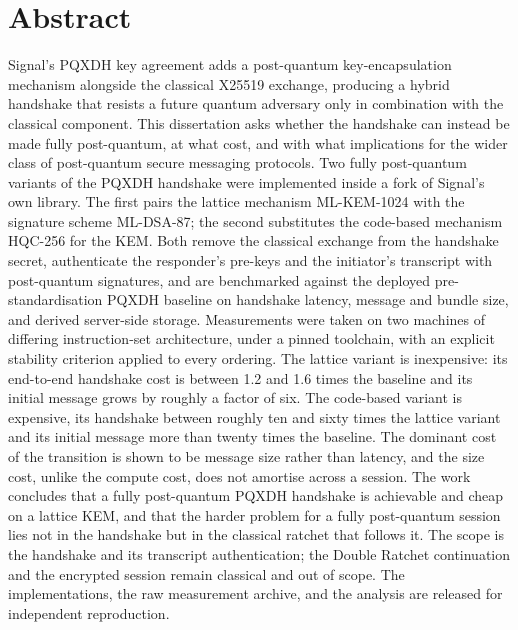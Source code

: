 \section*{Abstract}

Signal's PQXDH key agreement adds a post-quantum key-encapsulation mechanism alongside the classical X25519 exchange, producing a hybrid handshake that resists a future quantum adversary only in combination with the classical component. This dissertation asks whether the handshake can instead be made fully post-quantum, at what cost, and with what implications for the wider class of post-quantum secure messaging protocols. Two fully post-quantum variants of the PQXDH handshake were implemented inside a fork of Signal's own library. The first pairs the lattice mechanism ML-KEM-1024 with the signature scheme ML-DSA-87; the second substitutes the code-based mechanism HQC-256 for the KEM. Both remove the classical exchange from the handshake secret, authenticate the responder's pre-keys and the initiator's transcript with post-quantum signatures, and are benchmarked against the deployed pre-standardisation PQXDH baseline on handshake latency, message and bundle size, and derived server-side storage. Measurements were taken on two machines of differing instruction-set architecture, under a pinned toolchain, with an explicit stability criterion applied to every ordering. The lattice variant is inexpensive: its end-to-end handshake cost is between 1.2 and 1.6 times the baseline and its initial message grows by roughly a factor of six. The code-based variant is expensive, its handshake between roughly ten and sixty times the lattice variant and its initial message more than twenty times the baseline. The dominant cost of the transition is shown to be message size rather than latency, and the size cost, unlike the compute cost, does not amortise across a session. The work concludes that a fully post-quantum PQXDH handshake is achievable and cheap on a lattice KEM, and that the harder problem for a fully post-quantum session lies not in the handshake but in the classical ratchet that follows it. The scope is the handshake and its transcript authentication; the Double Ratchet continuation and the encrypted session remain classical and out of scope. The implementations, the raw measurement archive, and the analysis are released for independent reproduction.